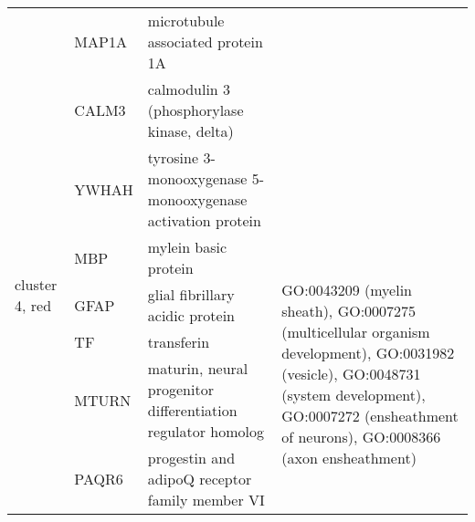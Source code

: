 \begin{table}[htp]
\begin{center}
\begin{tabular}{|p{0.7in}|p{0.7in}|p{2in}|p{3in}|}
			& \small{MAP1A} & \footnotesize{microtubule associated protein 1A} &\\
			&  \small{CALM3} & \footnotesize{calmodulin 3 (phosphorylase kinase, delta)} & \\
			& \small{YWHAH} & \footnotesize{tyrosine 3-monooxygenase  5-monooxygenase activation protein} & \\
\hline
 \multirow{3}{4em}{\small{cluster 4, red}} & \small{MBP} & \footnotesize{mylein basic protein} & \multirow{6}{16em}{\footnotesize{GO:0043209 (myelin sheath), GO:0007275 (multicellular organism development), GO:0031982 (vesicle), GO:0048731 (system development), GO:0007272 (ensheathment of neurons), GO:0008366 (axon ensheathment)}} \\
 			& \small{GFAP} & \footnotesize{glial fibrillary acidic protein} & \\
			& \small{TF} & \footnotesize{transferin} & \\
			& \small{MTURN} & \footnotesize{maturin, neural progenitor differentiation regulator homolog } & \\
			& \small{PAQR6} & \footnotesize{progestin and adipoQ receptor family member VI} & \\
\hline	
\end{tabular}
\end{center} \label{tab:tab2}
 \end{table}

